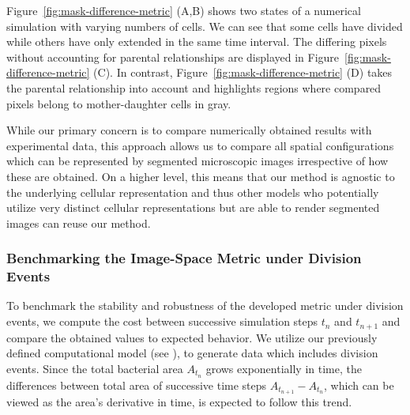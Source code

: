 \documentclass[10pt,letterpaper]{article}
\begin{document}
Figure~\ref{fig:mask-difference-metric} (A,B) shows two states of a numerical simulation
with varying numbers of cells.
We can see that some cells have divided while others have only extended in the same time interval.
The differing pixels without accounting for parental relationships are displayed in
Figure~\ref{fig:mask-difference-metric} (C).
In contrast, Figure~\ref{fig:mask-difference-metric} (D) takes the parental relationship into
account and highlights regions where compared pixels belong to mother-daughter cells in gray.


While our primary concern is to compare numerically obtained results with experimental data,
this approach allows us to compare all spatial configurations which can be represented
by segmented microscopic images irrespective of how these are obtained.
On a higher level, this means that our method is agnostic to the underlying cellular representation
and thus other models who potentially utilize very distinct cellular representations but are
able to render segmented images can reuse our method.

\subsubsection{Benchmarking the Image-Space Metric under Division Events}
To benchmark the stability and robustness of the developed metric under division events, we compute
the cost between successive simulation steps $t_n$ and $t_{n+1}$ and compare the obtained values to
expected behavior.
We utilize our previously defined computational model (see ), to
generate data which includes division events.
Since the total bacterial area $A_{t_n}$ grows exponentially in time, the differences between total
area of successive time steps $A_{t_{n+1}}-A_{t_n}$, which can be viewed as the area's derivative in
time, is expected to follow this trend.
\end{document}
